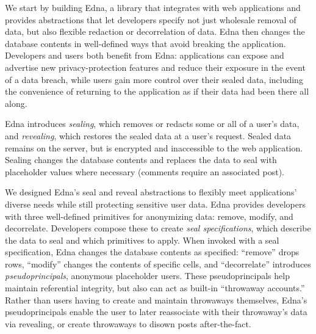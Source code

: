 We start by building Edna, a library that integrates with web applications and
provides abstractions that let developers specify not just wholesale removal of
data, but also flexible redaction or decorrelation of data. Edna then changes
the database contents in well-defined ways that avoid breaking the application.
Developers and users both benefit from Edna: applications can expose and
advertise new privacy-protection features and reduce their exposure in the event
of a data breach, while users gain more control over their sealed data,
including the convenience of returning to the application as if their data had
been there all along.

Edna introduces \emph{sealing}, which removes or redacts some or all of a user's
data, and \emph{revealing}, which restores the sealed data at a user's request.
Sealed data remains on the server, but is encrypted and inaccessible to the web
application. Sealing changes the database contents and replaces the data to seal
with placeholder values where necessary (\eg comments require an associated
post). 

We designed Edna's seal and reveal abstractions to flexibly meet applications'
diverse needs while still protecting sensitive user data. Edna provides
developers with three well-defined primitives for anonymizing data: remove,
modify, and decorrelate. Developers compose these to create \emph{seal
specifications}, which describe the data to seal and which primitives to apply.
When invoked with a seal specification, Edna changes the database contents as
specified: ``remove'' drops rows, ``modify'' changes the contents of specific
cells, and ``decorrelate'' introduces \emph{pseudoprincipals}, anonymous
placeholder users. These pseudoprincipals help maintain referential integrity,
but also can act as built-in ``throwaway accounts.'' Rather than users having to
create and maintain throwaways themselves, Edna's pseudoprincipals enable the
user to later reassociate with their throwaway's data via revealing, or create
throwaways to disown posts after-the-fact.

\begin{comment}
\section{Related Work}
\label{sec:intro:related}

\section{Approach}
\label{sec:intro:approach}


\section{Contributions}
\label{sec:intro:contributions}


\section{Reading Guide}
\label{sec:intro:reading-guide}
\end{comment}
